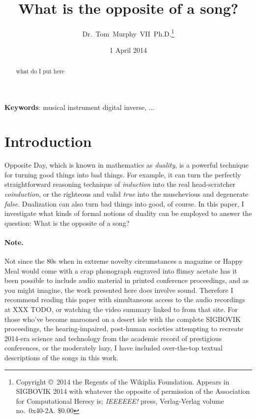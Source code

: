 \documentclass[twocolumn]{article}
\begin{document}
 

\title{What is the opposite of a song?}
\author{Dr.~Tom~Murphy~VII~Ph.D.\thanks{
Copyright \copyright\ 2014 the Regents of the Wikiplia
Foundation. Appears in SIGBOVIK 2014 with whatever the
opposite of permission of the 
Association for Computational Heresy is; {\em IEEEEEE!} press,
Verlag-Verlag volume no.~0x40-2A.
\$0.00}
}

\renewcommand\th{\ensuremath{{}^{\textrm{th}}}}
\newcommand\st{\ensuremath{{}^{\textrm{st}}}}
\newcommand\rd{\ensuremath{{}^{\textrm{rd}}}}
\newcommand\nd{\ensuremath{{}^{\textrm{nd}}}}
\newcommand\at{\ensuremath{\scriptstyle @}}

\date{1 April 2014}

\maketitle \thispagestyle{empty}

\begin{abstract}
what do I put here
\end{abstract}

\vspace{1em}
{\noindent \small {\bf Keywords}:
  musical instrument digital inverse,
  ...
}

\section*{Introduction}

Opposite Day, which is known in mathematics as {\it duality}, is a
powerful technique for turning good things into bad things. For
example, it can turn the perfectly straightforward reasoning technique
of {\it induction} into the real head-scratcher {\it coinduction}, or
the righteous and valid {\it true} into the muschevious and degenerate
{\it false}. Dualization can also turn bad things into good, of
course. In this paper, I investigate what kinds of formal notions of
duality can be employed to answer the question: What is the opposite
of a song?

\paragraph{Note.} Not since the 80s when in extreme novelty circumstances a magazine or
Happy Meal would come with a crap phonograph engraved into flimsy acetate has
it been possible to include audio material in printed conference
proceedings, and as you might imagine, the work presented here does
involve sound. Therefore I recommend reading this paper with
simultaneous access to the audio recordings at {XXX TODO}, or watching
the video summary linked to from that site. For those who've become
marooned on a desert isle with the complete SIGBOVIK proceedings, the
hearing-impaired, post-human societies attempting to recreate 2014-era
science and technology from the academic record of prestigious
conferences, or the moderately lazy, I have included over-the-top
textual descriptions of the songs in this work.
\end{document}

